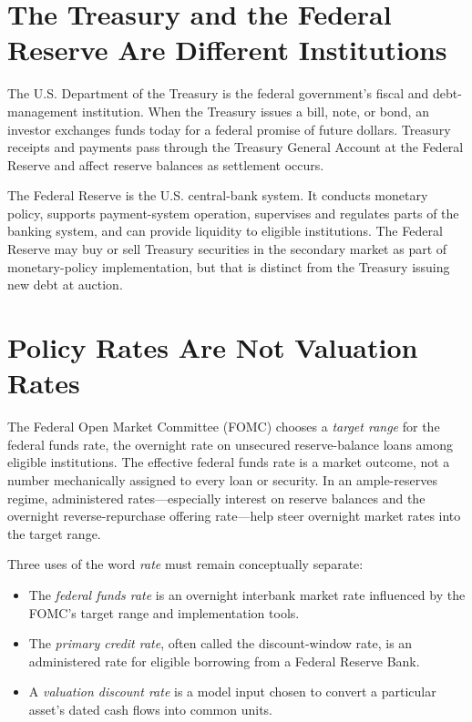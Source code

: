 \documentclass[11pt]{article}
\begin{document}
\section{The Treasury and the Federal Reserve Are Different Institutions}

The U.S. Department of the Treasury is the federal government's fiscal and debt-management institution. When the Treasury issues a bill, note, or bond, an investor exchanges funds today for a federal promise of future dollars. Treasury receipts and payments pass through the Treasury General Account at the Federal Reserve and affect reserve balances as settlement occurs.

The Federal Reserve is the U.S. central-bank system. It conducts monetary policy, supports payment-system operation, supervises and regulates parts of the banking system, and can provide liquidity to eligible institutions. The Federal Reserve may buy or sell Treasury securities in the secondary market as part of monetary-policy implementation, but that is distinct from the Treasury issuing new debt at auction.

\section{Policy Rates Are Not Valuation Rates}

The Federal Open Market Committee (FOMC) chooses a \emph{target range} for the federal funds rate, the overnight rate on unsecured reserve-balance loans among eligible institutions. The effective federal funds rate is a market outcome, not a number mechanically assigned to every loan or security. In an ample-reserves regime, administered rates---especially interest on reserve balances and the overnight reverse-repurchase offering rate---help steer overnight market rates into the target range.

Three uses of the word \emph{rate} must remain conceptually separate:

\begin{itemize}
  \item The \emph{federal funds rate} is an overnight interbank market rate influenced by the FOMC's target range and implementation tools.
  \item The \emph{primary credit rate}, often called the discount-window rate, is an administered rate for eligible borrowing from a Federal Reserve Bank.
  \item A \emph{valuation discount rate} is a model input chosen to convert a particular asset's dated cash flows into common units.
\end{itemize}
\end{document}
